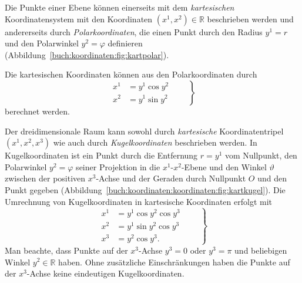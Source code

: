 \begin{beispiel}
\label{buch:koordinaten:koordinaten:beispiel:kartpolar}

Die Punkte einer Ebene können einerseits mit dem {\em kartesischen}
Koordinatensystem mit den Koordinaten $(x^1,x^2)\in\mathbb{R}$ 
beschrieben werden und andererseits durch {\em Polarkoordinaten},
%
die einen Punkt durch den Radius $y^1 = r$ und den Polarwinkel
$y^2 = \varphi$ definieren (Abbildung~\ref{buch:koordinaten:fig:kartpolar}).

Die kartesischen Koordinaten können aus den Polarkoordinaten durch
\begin{equation}
\left.
\begin{aligned}
x^1 &= y^1\cos y^2 \\
x^2 &= y^1\sin y^2
\end{aligned}
\qquad
\right\}
\label{buch:koordinaten:koordinaten:eqn:polarkartumrechnung}
\end{equation}
berechnet werden.
\end{beispiel}

\begin{beispiel}
\label{buch:koordinaten:koordinaten:beispiel:kartkugel}

Der dreidimensionale Raum kann sowohl durch {\em kartesische}
Koordinatentripel $(x^1,x^2,x^3)$ wie auch durch {\em Kugelkoordinaten}
%
beschrieben werden.
In Kugelkoordinaten ist ein Punkt durch die Entfernung $r=y^1$ vom
Nullpunkt, den Polarwinkel $y^2=\varphi$ seiner Projektion in die 
$x^1$-$x^2$-Ebene und den Winkel $\vartheta$ zwischen der positiven
$x^3$-Achse und der Geraden durch Nullpunkt $O$ und den Punkt gegeben
(Abbildung~\ref{buch:koordinaten:koordinaten:fig:kartkugel}).
Die Umrechnung von Kugelkoordinaten in kartesische Koordinaten
erfolgt mit
\begin{equation}
\left.
\begin{aligned}
x^1
&=
y^1 \cos y^2 \cos y^3 \\
x^2
&=
y^1 \sin y^2 \cos y^3 \\
x^3
&=
y^2 \cos y^3.
\end{aligned}
\qquad\right\}
\label{buch:koordinaten:koordinaten:eqn:kugelkartumrechnung}
\end{equation}
Man beachte, dass Punkte auf der $x^3$-Achse $y^3=0$ oder
$y^3=\pi$ und beliebigen Winkel $y^2\in\mathbb{R}$ haben.
Ohne zusätzliche Einschränkungen haben die Punkte auf der
$x^3$-Achse keine eindeutigen Kugelkoordinaten.
\end{beispiel}


